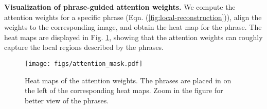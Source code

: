 \documentclass[runningheads]{llncs}
\begin{document}
  

\noindent  \textbf{Visualization of phrase-guided attention weights.}  We compute the attention weights for a specific phrase (Eqn. (\ref{fig:local-reconstruction})), align the weights to the corresponding image, and obtain the heat map for the phrase. The heat maps are displayed in Fig. \ref{attention_masks}, showing that the attention weights can roughly capture the local regions described by the phrases.
  
     \begin{figure}[t]
 \begin{center}
\texttt{[image: figs/attention\_mask.pdf]}
 \vspace{-1em}
 \caption{Heat maps of the attention weights. The phrases are placed in on the left of the corresponding heat maps. Zoom in the figure for better view of the phrases.}  \vspace{-1em} \label{attention_masks} 
 \end{center}
\end{figure}

\begin{table}[t]
   \begin{minipage}{0.75\textwidth}
\end{minipage}
 ~\hfill~
\begin{minipage}{0.22\textwidth}
    \label{cross-results}
\end{minipage} 
\vspace{-1em}
\end{table}

 
\end{document}
